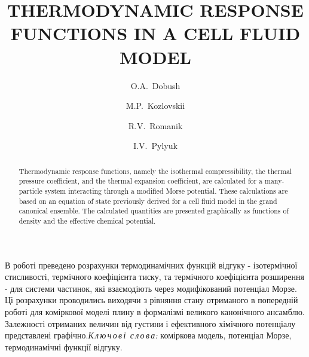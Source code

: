 \documentclass[fleqn,twoside,twocolumn,nofootinbib,showkeys]{revtex4} %
\begin{document}
	\title[Thermodynamic response functions in a cell fluid model]%
	{THERMODYNAMIC RESPONSE FUNCTIONS IN A CELL FLUID MODEL}%
	\author{O.A.~Dobush}%
	\author{M.P.~Kozlovskii}
	\author{R.V.~Romanik}
	\author{I.V.~Pylyuk}
	\address{1, Svientsitskii Str., Lviv 79011, Ukraine}%
	
	 \razd{\secv}
	
	
	\setcounter{page}{1}%
	
	\begin{abstract}
		Thermodynamic response functions, namely the isothermal compressibility, the thermal pressure coefficient, and the thermal expansion coefficient, are calculated for a many-particle system interacting through a modified Morse potential. These calculations are based on an equation of state previously derived for a cell fluid model in the grand canonical ensemble. The calculated quantities are presented graphically as functions of density and the effective chemical potential.
	\end{abstract}
	
	
	\maketitle
	
	
	
		
	\vspace*{-5mm} {В роботі преведено розрахунки термодинамічних функцій відгуку - ізотермічної стисливості, термічного коефіцієнта тиску, та термічного коефіцієнта розширення - для системи частинок, які взаємодіють через модифікований потенціал Морзе. Ці розрахунки проводились виходячи з рівняння стану отриманого в попередній роботі для коміркової моделі плину в формалізмі великого канонічного ансамблю. Залежності отриманих величин від густини і ефективного хімічного потенціалу представлені графічно.}{\textit{К\,л\,ю\,ч\,о\,в\,і\,
			с\,л\,о\,в\,а:} коміркова модель, потенціал Морзе, термодинамічні функції відгуку.}
	
\end{document}
